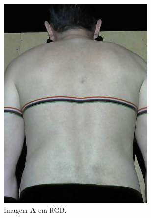 \documentclass[a4paper, 12pt]{article}
\begin{document}
\begin{figure}[!h]
     \centering
     \begin{subfigure}[b]{0.35\textwidth}
         \centering
         \includegraphics[width=0.85\textwidth]{11_obj_color.jpg}
         \caption{Imagem $\mathbf{A}$ em RGB.}
         \label{fig:cordetect:rgb}
     \end{subfigure}
     \begin{subfigure}[b]{0.35\textwidth}
         \centering

\end{subfigure}
\end{figure}
\end{document}
